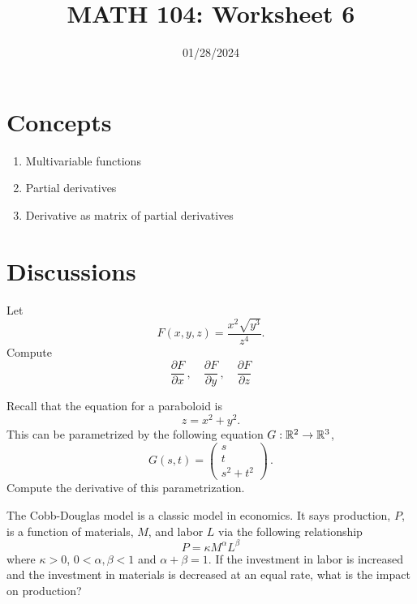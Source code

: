 \documentclass[12pt]{amsart}
\title{ MATH 104: Worksheet 6}
\author{}
\date{01/28/2024}
\begin{document}
\maketitle

\section{Concepts}

\begin{enumerate}
    \item Multivariable functions
    \item Partial derivatives
    \item Derivative as matrix of partial derivatives
\end{enumerate}

\section{Discussions}

\begin{question}
    Let 
$$ F(x,y,z) = \frac{x^2\sqrt{y^3}}{z^4}.$$
Compute
$$ \frac{\partial F}{\partial x}\,, \quad \frac{\partial F}{\partial y} \,, \quad \frac{\partial F}{\partial z}$$
\end{question}

\begin{question}
    Recall that the equation for a paraboloid is
    $$ z = x^2 + y^2. $$
    This can be parametrized by the following equation $G: \mathbb{R}^2 \to \mathbb{R}^3$,
    $$ G(s,t) = \begin{pmatrix}
        s \\ t \\ s^2 + t^2 
    \end{pmatrix} \,.$$
    Compute the derivative of this parametrization.
\end{question}

\begin{question}
    The Cobb-Douglas model is a classic model in economics.
    It says production, $P$, is a function of materials, $M$, and labor $L$ 
    via the following relationship
    \begin{equation*}
        P = \kappa M^\alpha L^\beta
    \end{equation*}
    where $\kappa >0$, $0<\alpha, \beta <1$ and $\alpha + \beta = 1$.
    If the investment in labor is increased and the investment in materials
    is decreased at an equal rate, what is the impact on production?
\end{question}
\end{document}
